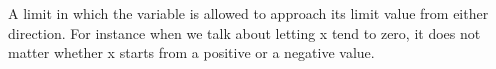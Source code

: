 A limit in which the variable is allowed to approach its limit value from either
direction. For instance when we talk about letting x tend to zero, it does not
matter whether x starts from a positive or a negative value.